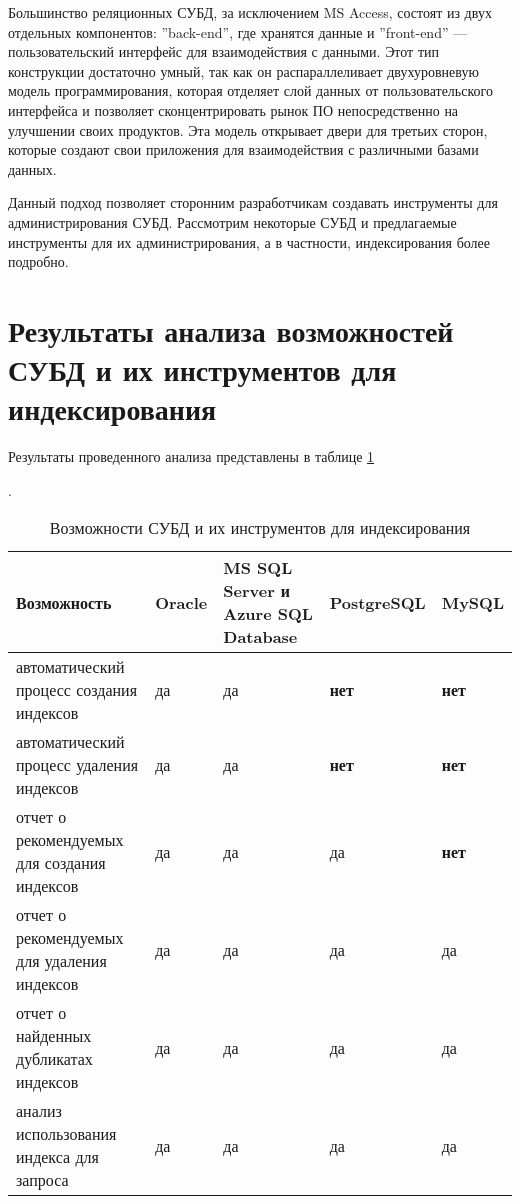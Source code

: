 Большинство реляционных СУБД, за исключением MS Access, состоят из двух отдельных компонентов: ''back-end'', где хранятся данные и ''front-end'' — пользовательский интерфейс для взаимодействия с данными. Этот тип конструкции достаточно умный, так как он распараллеливает двухуровневую модель программирования, которая отделяет слой данных от пользовательского интерфейса и позволяет сконцентрировать рынок ПО непосредственно на улучшении своих продуктов. Эта модель открывает двери для третьих сторон, которые создают свои приложения для взаимодействия с различными базами данных. \cite{habrahabr.ru:10_best_tools} 

Данный подход позволяет сторонним разработчикам создавать инструменты для администрирования СУБД. Рассмотрим некоторые СУБД и предлагаемые инструменты для их администрирования, а в частности, индексирования более подробно.









\section{Результаты анализа возможностей СУБД и их инструментов для индексирования}

Результаты проведенного анализа представлены в таблице  \ref{table:dbms_and_tools_for_indexes}

\begin{table}[h]
\caption{Возможности СУБД и их инструментов для индексирования}\label{table:dbms_and_tools_for_indexes}.
\medskip
\begin{tabular}{|p{4cm}|p{2cm}|p{2cm}|p{2cm}|p{2cm}|}
\hline
Возможность & Oracle & MS SQL Server и Azure SQL Database & PostgreSQL & MySQL\\
\hline
автоматический процесс создания индексов & да & да & \textbf{нет} & \textbf{нет}\\
\hline
автоматический процесс удаления индексов & да & да & \textbf{нет} & \textbf{нет}\\
\hline
отчет о рекомендуемых для создания индексов & да & да & да & \textbf{нет}\\
\hline
отчет о рекомендуемых для удаления индексов & да & да & да & да\\
\hline
отчет о найденных дубликатах индексов & да & да & да & да\\
\hline
анализ использования индекса для запроса & да & да & да & да\\
\hline
\end{tabular}
\end{table}

